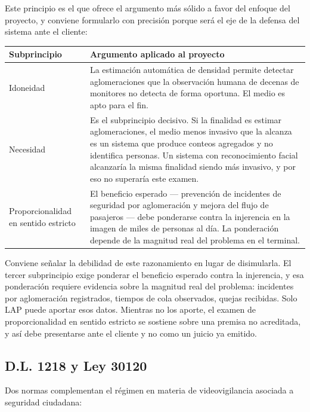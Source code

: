 Este principio es el que ofrece el argumento más sólido a favor del
enfoque del proyecto, y conviene formularlo con precisión porque será el
eje de la defensa del sistema ante el cliente:

\begin{center}
\small
\begin{tabularx}{\linewidth}{@{}L{3.0cm}Y@{}}
\toprule
\textbf{Subprincipio} & \textbf{Argumento aplicado al proyecto} \\
\midrule
Idoneidad &
La estimación automática de densidad permite detectar aglomeraciones que
la observación humana de decenas de monitores no detecta de forma
oportuna. El medio es apto para el fin. \\
\addlinespace
Necesidad &
Es el subprincipio decisivo. Si la finalidad es estimar aglomeraciones,
el medio menos invasivo que la alcanza es un sistema que produce conteos
agregados y no identifica personas. Un sistema con reconocimiento facial
alcanzaría la misma finalidad siendo más invasivo, y por eso no
superaría este examen. \\
\addlinespace
Proporcionalidad en sentido estricto &
El beneficio esperado --- prevención de incidentes de seguridad por
aglomeración y mejora del flujo de pasajeros --- debe ponderarse contra
la injerencia en la imagen de miles de personas al día. La ponderación
depende de la magnitud real del problema en el terminal. \\
\bottomrule
\end{tabularx}
\end{center}

Conviene señalar la debilidad de este razonamiento en lugar de
disimularla. El tercer subprincipio exige ponderar el beneficio esperado
contra la injerencia, y esa ponderación requiere evidencia sobre la
magnitud real del problema: incidentes por aglomeración registrados,
tiempos de cola observados, quejas recibidas. Solo LAP puede aportar esos
datos. Mientras no los aporte, el examen de proporcionalidad en sentido
estricto se sostiene sobre una premisa no acreditada, y así debe
presentarse ante el cliente y no como un juicio ya emitido.

\subsection{D.L. 1218 y Ley 30120}
\label{sec:dl1218}

Dos normas complementan el régimen en materia de videovigilancia asociada
a seguridad ciudadana:

